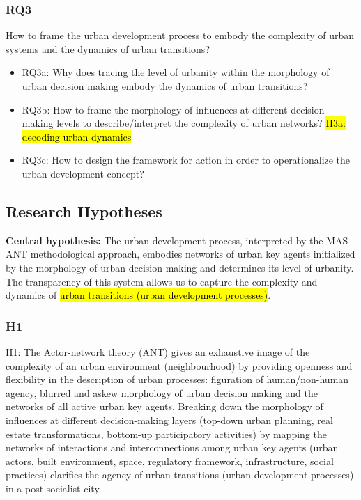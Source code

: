 \documentclass[11pt]{report}
\begin{document}
\subsubsection{RQ3}
How to frame the urban development process to embody the complexity of urban systems and the dynamics of urban transitions?
\begin{itemize}
\item RQ3a: Why does tracing the level of urbanity within the morphology of urban decision making embody the dynamics of urban transitions?
\item RQ3b: How to frame the morphology of influences at different decision-making levels to describe/interpret the complexity of urban networks?  \hl{H3a: decoding urban dynamics}
\item RQ3c: How to design the framework for action in order to operationalize the urban development concept?
\end {itemize}

\subsection{Research Hypotheses}
\textbf{Central hypothesis:} The urban development process, interpreted by the MAS-ANT methodological approach, embodies networks of urban key agents initialized by the morphology of urban decision making and determines its level of urbanity.
The transparency of this system allows us to  capture the complexity and dynamics of \hl{urban transitions (urban development processes)}. 

\subsubsection{H1}

H1: The Actor-network theory (ANT) gives an exhaustive image of the complexity of an urban environment (neighbourhood) by providing openness and flexibility in the description of urban processes: figuration of human/non-human agency, blurred and askew morphology of urban decision making and the networks of all active urban key agents.
Breaking  down  the morphology of influences at different decision-making layers (top-down urban planning, real estate transformations, bottom-up participatory activities) by mapping the networks of interactions and interconnections among urban key agents (urban actors, built environment, space, regulatory framework, infrastructure, 
social practices) clarifies the agency of urban transitions (urban development processes) in a post-socialist city.
\end{document}

